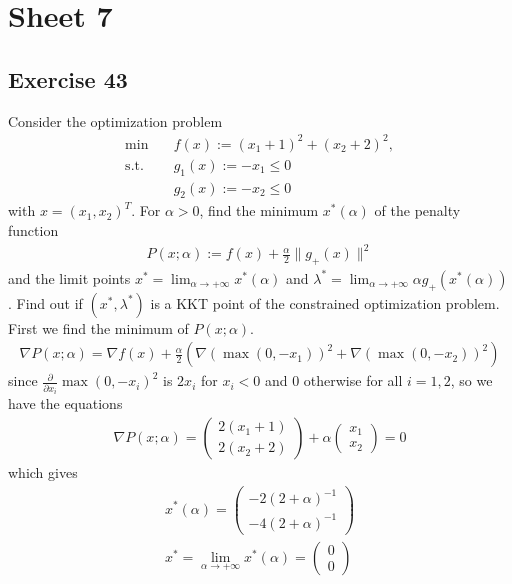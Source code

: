 


\maketitle
\tableofcontents

\section{Sheet 7}
\subsection{Exercise 43}
Consider the optimization problem
\begin{align}
    \text{min}\quad &f(x) := (x_1+1)^{2}+(x_2+2)^2,\\
    \text{s.t.}\quad & g_1(x) := -x_1 \le 0 \nonumber\\
    & g_2(x) := -x_2 \le 0 \nonumber
\end{align}
with $x = (x_1,x_2)^{T}$. For $\alpha >0$, find the minimum $x^{*}(\alpha)$
of the penalty function
\begin{align}
    P(x;\alpha) := f(x) + \frac{\alpha}{2} \|g_+(x)\|^2
\end{align}
and the limit points $x^{*}=\lim_{\alpha \to +\infty} x^{*}(\alpha)$ and
$\lambda^{*} = \lim_{\alpha \to +\infty}\alpha g_+ (x^{*}(\alpha))$. Find out
if $(x^{*}, \lambda^{*})$ is a KKT point of the constrained optimization
problem.
\newline
First we find the minimum of $P(x;\alpha)$.
\begin{align}
    \nabla P(x;\alpha)
    = \nabla f(x) + \frac{\alpha}{2}\left(\nabla\left(\max(0,-x_1)\right)^{2}
    +\nabla \left( \max\left(0,-x_2\right) \right)^{2} \right)
\end{align}
since $\frac{\partial }{\partial x_i} \max(0, -x_i)^2$ is $2x_i$ for $x_i < 0$
and $0$ otherwise for all $i=1,2$, so we have the equations
\begin{align}
    \nabla P(x;\alpha) =
    \begin{pmatrix}
        2(x_1+1)\\
        2(x_2+2)
    \end{pmatrix}
    + \alpha
    \begin{pmatrix}
        x_1\\
        x_2
    \end{pmatrix}= 0
\end{align}
which gives
\begin{align}
    x^{*}(\alpha) =
    \begin{pmatrix}
        -2(2+\alpha)^{-1}\\
        -4(2+\alpha)^{-1}
    \end{pmatrix}\\
    x^{*} = \lim_{\alpha \to +\infty}x^{*}(\alpha)=
    \begin{pmatrix} 0\\0 \end{pmatrix}
\end{align}
